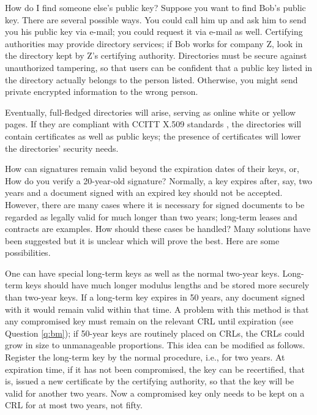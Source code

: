 {How do I find someone else's public key?}
Suppose you want to find Bob's public key. There are several possible ways.
You could call him up and ask him to send you his public key via e-mail; you 
could request it via e-mail as well. Certifying authorities may provide
directory services; if Bob works for company Z, look in the directory kept 
by Z's certifying authority. Directories must be secure against unauthorized 
tampering, so that users can be confident that a public key listed in the 
directory actually belongs to the person listed. Otherwise, you might send 
private encrypted information to the wrong person.

Eventually, full-fledged directories will arise, serving as online white or 
yellow pages. If they are compliant with CCITT X.509 standards 
\cite{ccitt-X.509}, the directories will contain certificates as well as 
public keys; the presence of certificates will lower the directories' 
security needs.

{How can signatures remain valid beyond the expiration dates of their
    keys, or, How do you verify a 20-year-old signature?}
Normally, a key expires after, say, two years and a document signed with an 
expired key should not be accepted. However, there are many cases where 
it is necessary for signed documents to be regarded as legally valid 
for much longer than two years; long-term leases and contracts are examples. 
How should these cases be handled? Many solutions have been suggested but 
it is unclear which will prove the best. Here are some possibilities.

One can have special long-term keys as well as the normal two-year keys. 
Long-term keys should have much longer modulus lengths and be stored 
more securely than two-year keys. If a long-term key expires in 50 
years, any document signed with it would remain valid within that time. 
A problem with this method is that any compromised key must remain on the 
relevant CRL until expiration (see Question \ref {q:bm}); if 50-year 
keys are routinely placed on CRLs, the CRLs could grow in size to 
unmanageable proportions. This idea can be modified as follows. Register 
the long-term key by the normal procedure, i.e., for two years. At 
expiration time, if it has not been compromised, the key can be recertified, 
that is, issued a new certificate by the certifying authority, so that the 
key will be valid for another two years. Now a compromised key only needs 
to be kept on a CRL for at most two years, not fifty. 

